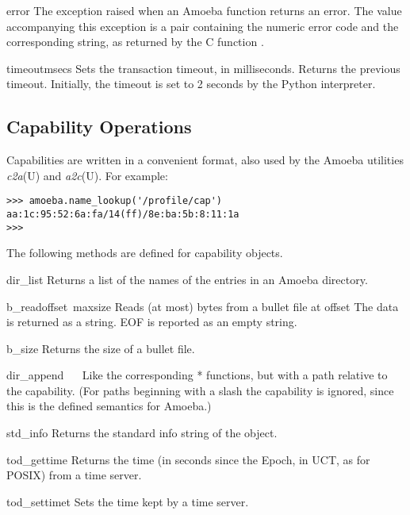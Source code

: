 \begin{excdesc}{error}
The exception raised when an Amoeba function returns an error.
The value accompanying this exception is a pair containing the numeric
error code and the corresponding string, as returned by the C function
.
\end{excdesc}

\begin{funcdesc}{timeout}{msecs}
Sets the transaction timeout, in milliseconds.
Returns the previous timeout.
Initially, the timeout is set to 2 seconds by the Python interpreter.
\end{funcdesc}

\subsection{Capability Operations}

Capabilities are written in a convenient \ASCII{} format, also used by the
Amoeba utilities
{\it c2a}(U)
and
{\it a2c}(U).
For example:

\bcode\begin{verbatim}
>>> amoeba.name_lookup('/profile/cap')
aa:1c:95:52:6a:fa/14(ff)/8e:ba:5b:8:11:1a
>>> 
\end{verbatim}\ecode
%
The following methods are defined for capability objects.

\renewcommand{\indexsubitem}{(capability method)}
\begin{funcdesc}{dir_list}{}
Returns a list of the names of the entries in an Amoeba directory.
\end{funcdesc}

\begin{funcdesc}{b_read}{offset\, maxsize}
Reads (at most)
bytes from a bullet file at offset
The data is returned as a string.
EOF is reported as an empty string.
\end{funcdesc}

\begin{funcdesc}{b_size}{}
Returns the size of a bullet file.
\end{funcdesc}

\begin{funcdesc}{dir_append}{}
\ 
\ 
Like the corresponding
*
functions, but with a path relative to the capability.
(For paths beginning with a slash the capability is ignored, since this
is the defined semantics for Amoeba.)
\end{funcdesc}

\begin{funcdesc}{std_info}{}
Returns the standard info string of the object.
\end{funcdesc}

\begin{funcdesc}{tod_gettime}{}
Returns the time (in seconds since the Epoch, in UCT, as for POSIX) from
a time server.
\end{funcdesc}

\begin{funcdesc}{tod_settime}{t}
Sets the time kept by a time server.
\end{funcdesc}
